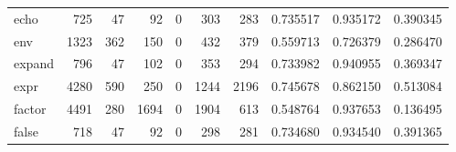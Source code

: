 \begin{longtable}{lrrrrrrrrr}
echo      &                                                725 &                                                 47 &                                                 92 &                                                  0 &                                                303 &                                                283 &                                           0.735517 &                               0.935172 &                             0.390345 \\
env       &                                               1323 &                                                362 &                                                150 &                                                  0 &                                                432 &                                                379 &                                           0.559713 &                               0.726379 &                             0.286470 \\
expand    &                                                796 &                                                 47 &                                                102 &                                                  0 &                                                353 &                                                294 &                                           0.733982 &                               0.940955 &                             0.369347 \\
expr      &                                               4280 &                                                590 &                                                250 &                                                  0 &                                               1244 &                                               2196 &                                           0.745678 &                               0.862150 &                             0.513084 \\
factor    &                                               4491 &                                                280 &                                               1694 &                                                  0 &                                               1904 &                                                613 &                                           0.548764 &                               0.937653 &                             0.136495 \\
false     &                                                718 &                                                 47 &                                                 92 &                                                  0 &                                                298 &                                                281 &                                           0.734680 &                               0.934540 &                             0.391365 \\

\end{longtable}
